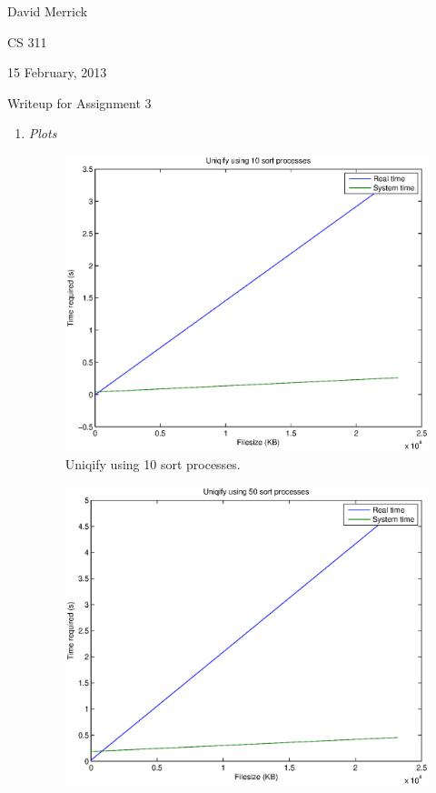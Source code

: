 \documentclass[letterpaper,10pt,titlepage]{article}
\begin{document}
David Merrick

CS 311

15 February, 2013

\begin{center}
{\LARGE Writeup for Assignment 3}
\end{center}

\begin{enumerate}

\item \emph{Plots}
\begin{figure}[H]
	\begin{center}
	\includegraphics[width=8in]{figure1}
	\end{center}
	\caption{Uniqify using 10 sort processes.}
\end{figure}
\begin{figure}[H]
	\begin{center}
	\includegraphics[width=8in]{figure2}

\end{center}
\end{figure}
\end{enumerate}
\end{document}
